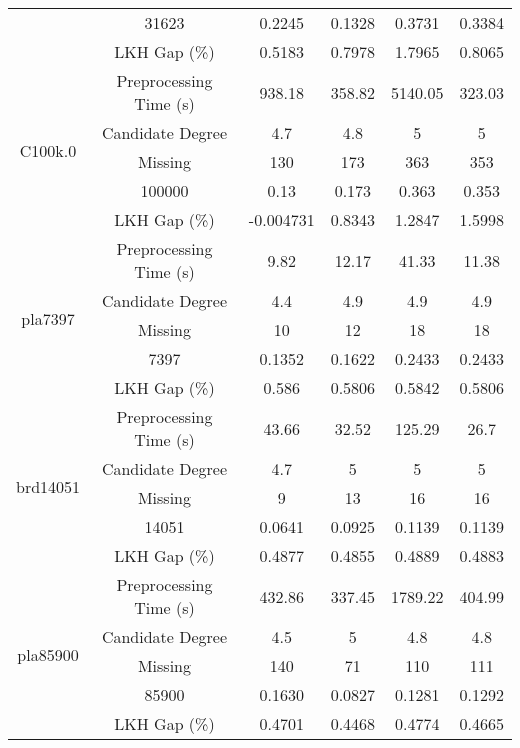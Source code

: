 \begin{table}[htbp]
\begin{tabular}{cccccc}
            & 31623 & 0.2245  & 0.1328  & 0.3731  & 0.3384  \\
            & LKH Gap (\%) & 0.5183 & 0.7978 & 1.7965 & 0.8065 \\
      \midrule
      \multirow{5}[2]{*}{C100k.0} & Preprocessing Time (s) & 938.18 & 358.82 & 5140.05 & 323.03 \\
            & Candidate Degree & 4.7   & 4.8   & 5     & 5 \\
            & Missing & 130   & 173   & 363   & 353 \\
            & 100000 & 0.13  & 0.173 & 0.363 & 0.353 \\
            & LKH Gap (\%) & -0.004731 & 0.8343 & 1.2847 & 1.5998 \\
      \midrule
      \multirow{5}[2]{*}{pla7397} & Preprocessing Time (s) & 9.82  & 12.17 & 41.33 & 11.38 \\
            & Candidate Degree & 4.4   & 4.9   & 4.9   & 4.9 \\
            & Missing & 10    & 12    & 18    & 18 \\
            & 7397  & 0.1352  & 0.1622  & 0.2433  & 0.2433  \\
            & LKH Gap (\%) & 0.586 & 0.5806 & 0.5842 & 0.5806 \\
      \midrule
      \multirow{5}[2]{*}{brd14051} & Preprocessing Time (s) & 43.66 & 32.52 & 125.29 & 26.7 \\
            & Candidate Degree & 4.7   & 5     & 5     & 5 \\
            & Missing & 9     & 13    & 16    & 16 \\
            & 14051 & 0.0641  & 0.0925  & 0.1139  & 0.1139  \\
            & LKH Gap (\%) & 0.4877 & 0.4855 & 0.4889 & 0.4883 \\
      \midrule
      \multirow{5}[2]{*}{pla85900} & Preprocessing Time (s) & 432.86 & 337.45 & 1789.22 & 404.99 \\
            & Candidate Degree & 4.5   & 5     & 4.8   & 4.8 \\
            & Missing & 140   & 71    & 110   & 111 \\
            & 85900 & 0.1630  & 0.0827  & 0.1281  & 0.1292  \\
            & LKH Gap (\%) & 0.4701 & 0.4468 & 0.4774 & 0.4665 \\
      \bottomrule
      \end{tabular}%
    \label{tab:addlabel}%
  \end{table}%
  